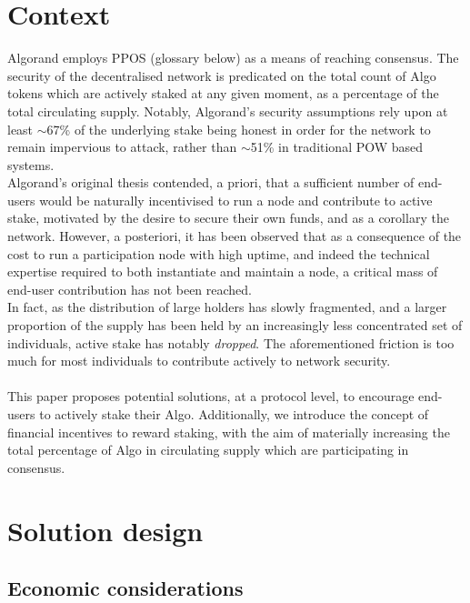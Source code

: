 \documentclass[11pt,a4paper]{article}
\begin{document}
\pagebreak

\section{Context}
Algorand employs \gls{PPOS} (glossary below) as a means of reaching consensus. The security of the decentralised network 
is predicated on the total count of Algo tokens which are actively staked at any given moment, as a percentage of the 
total circulating supply. Notably, Algorand's security assumptions rely upon at least $\sim$67\% of the underlying stake 
being honest in order for the network to remain impervious to attack, rather than $\sim$51\% in traditional \gls{POW} 
based systems. \\ 

Algorand's original thesis contended, a priori, that a sufficient number of end-users would be naturally incentivised to 
run a node and contribute to active stake, motivated by the desire to secure their own funds, and as a corollary the 
network. However, a posteriori, it has been observed that as a consequence of the cost to run a participation node with 
high uptime, and indeed the technical expertise required to both instantiate and maintain a node, a critical mass of 
end-user contribution has not been reached. \\

In fact, as the distribution of large holders has slowly fragmented, and a larger proportion of the supply has been held 
by an increasingly less concentrated set of individuals, active stake has notably \emph{dropped}. The aforementioned 
friction is too much for most individuals to contribute actively to network security. \\ \\

This paper proposes potential solutions, at a protocol level, to encourage end-users to actively stake their Algo.
Additionally, we introduce the concept of financial incentives to reward staking, with the aim of materially increasing 
the total percentage of Algo in circulating supply which are participating in consensus. 

\pagebreak

\section{Solution design}

\subsection{Economic considerations}
\end{document}

